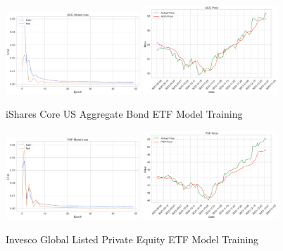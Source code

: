 \documentclass{ledger}
\begin{document}
\begin{figure}[htbp]
    \centering
    \includegraphics[width=0.45\textwidth]{code/price-prediction/lstm/images/agg_loss.png} %
    \hspace{0.05\textwidth} %
    \includegraphics[width=0.45\textwidth]{code/price-prediction/lstm/images/agg_price.png} %
    \caption{iShares Core US Aggregate Bond ETF Model Training}
    \label{fig:side_by_side}
\end{figure}

\begin{figure}[htbp]
    \centering
    \includegraphics[width=0.45\textwidth]{code/price-prediction/lstm/images/psp_loss.png} %
    \hspace{0.05\textwidth} %
    \includegraphics[width=0.45\textwidth]{code/price-prediction/lstm/images/psp_price.png} %
    \caption{Invesco Global Listed Private Equity ETF Model Training}
    \label{fig:side_by_side}
\end{figure}
\end{document}
